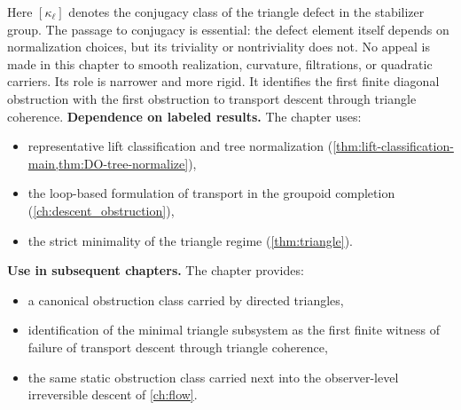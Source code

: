 Here \([\kappa_\ell]\) denotes the conjugacy class of the triangle
defect in the stabilizer group. The passage to conjugacy is essential:
the defect element itself depends on normalization choices, but its
triviality or nontriviality does not.
No appeal is made in this chapter to smooth realization, curvature,
filtrations, or quadratic carriers. Its role is narrower and more
rigid. It identifies the first finite diagonal obstruction with the
first obstruction to transport descent through triangle coherence.
\medskip
\noindent
\textbf{Dependence on labeled results.}
The chapter uses:
\begin{itemize}
	\item representative lift classification and tree normalization
	      (\cref{thm:lift-classification-main,thm:DO-tree-normalize}),
	\item the loop-based formulation of transport in the groupoid completion
	      (\cref{ch:descent_obstruction}),
	\item the strict minimality of the triangle regime
	      (\cref{thm:triangle}).
\end{itemize}
\medskip
\noindent
\textbf{Use in subsequent chapters.}
The chapter provides:
\begin{itemize}
	\item a canonical obstruction class carried by directed triangles,
	\item identification of the minimal triangle subsystem as the first
	      finite witness of failure of transport descent through triangle
	      coherence,
	\item the same static obstruction class carried next into the
	      observer-level irreversible descent of \cref{ch:flow}.
\end{itemize}
